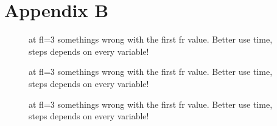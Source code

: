 \chapter{Appendix B}
% 
\begin{figure}[!tb]
\centering
{}
\caption{at fl=3 somethings wrong with the first fr value.
Better use time, steps depends on every variable!}
\end{figure}
% 
\begin{figure}[!tb]
\centering
{}
\caption{at fl=3 somethings wrong with the first fr value.
Better use time, steps depends on every variable!}
\end{figure}
% 
\begin{figure}[!tb]
\centering
{}
\caption{at fl=3 somethings wrong with the first fr value.
Better use time, steps depends on every variable!}
\end{figure}
% 
% 
